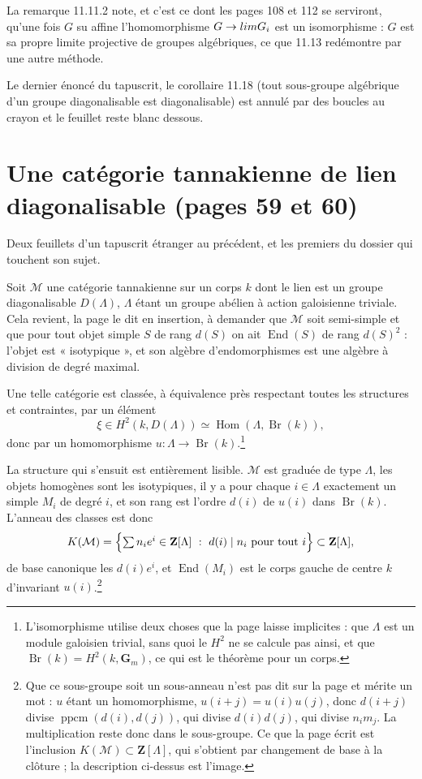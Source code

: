 \documentclass[11pt,a4paper]{article}
\begin{document}
La remarque 11.11.2 note, et c'est ce dont les pages 108 et 112 se serviront,
qu'une fois $G$ su affine l'homomorphisme $G \to \varprojlim G_{i}$ est un
isomorphisme : $G$ est sa propre limite projective de groupes algébriques, ce
que 11.13 redémontre par une autre méthode.

Le dernier énoncé du tapuscrit, le corollaire 11.18 (tout sous-groupe
algébrique d'un groupe diagonalisable est diagonalisable) est annulé par des
boucles au crayon et le feuillet reste blanc dessous.

\section*{Une catégorie tannakienne de lien diagonalisable (pages 59 et 60)}

Deux feuillets d'un tapuscrit étranger au précédent, et les premiers du dossier
qui touchent son sujet.

Soit $\mathcal{M}$ une catégorie tannakienne sur un corps $k$ dont le lien est
un groupe diagonalisable $D(\Lambda)$, $\Lambda$ étant un groupe abélien à
action galoisienne triviale. Cela revient, la page le dit en insertion, à
demander que $\mathcal{M}$ soit semi-simple et que pour tout objet simple $S$
de rang $d(S)$ on ait $\operatorname{End}(S)$ de rang $d(S)^{2}$ : l'objet est
« isotypique », et son algèbre d'endomorphismes est une algèbre à division de
degré maximal.

Une telle catégorie est classée, à équivalence près respectant toutes les
structures et contraintes, par un élément
\[
\xi \in H^{2}(k, D(\Lambda)) \simeq \operatorname{Hom}(\Lambda, \operatorname{Br}(k)) ,
\]
donc par un homomorphisme $u \colon \Lambda \to
\operatorname{Br}(k)$.\footnote{L'isomorphisme utilise deux choses que la page
laisse implicites : que $\Lambda$ est un module galoisien trivial, sans quoi le
$H^{2}$ ne se calcule pas ainsi, et que $\operatorname{Br}(k) = H^{2}(k,
\mathbf{G}_{m})$, ce qui est le théorème pour un corps.}

La structure qui s'ensuit est entièrement lisible. $\mathcal{M}$ est graduée de
type $\Lambda$, les objets homogènes sont les isotypiques, il y a pour chaque
$i \in \Lambda$ exactement un simple $M_{i}$ de degré $i$, et son rang est
l'ordre $d(i)$ de $u(i)$ dans $\operatorname{Br}(k)$. L'anneau des classes est
donc
\[
K(\mathcal{M}) = \Bigl\{ \textstyle\sum n_{i} e^{i} \in \mathbf{Z}[\Lambda]
\ :\ d(i) \mid n_{i} \ \text{pour tout } i \Bigr\} \subset \mathbf{Z}[\Lambda] ,
\]
de base canonique les $d(i)e^{i}$, et $\operatorname{End}(M_{i})$ est le corps
gauche de centre $k$ d'invariant $u(i)$.\footnote{Que ce sous-groupe soit un
sous-anneau n'est pas dit sur la page et mérite un mot : $u$ étant un
homomorphisme, $u(i+j) = u(i)u(j)$, donc $d(i+j)$ divise $\operatorname{ppcm}
(d(i), d(j))$, qui divise $d(i)d(j)$, qui divise $n_{i}m_{j}$. La
multiplication reste donc dans le sous-groupe. Ce que la page écrit est
l'inclusion $K(\mathcal{M}) \subset \mathbf{Z}[\Lambda]$, qui s'obtient par
changement de base à la clôture ; la description ci-dessus est l'image.}
\end{document}
